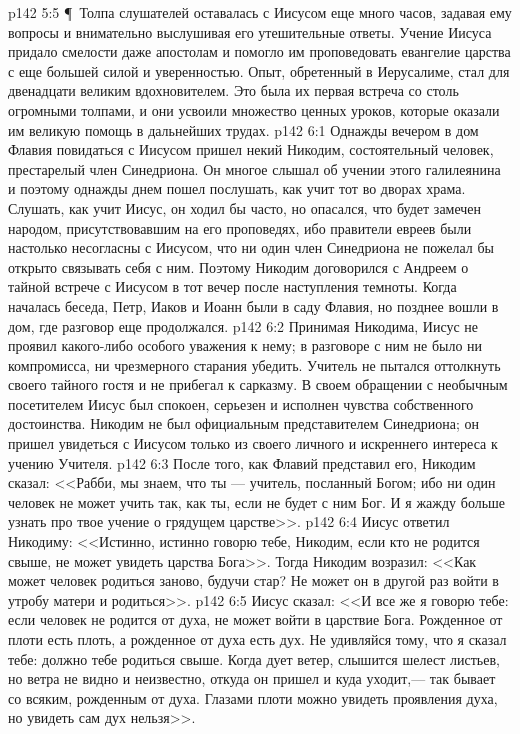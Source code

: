 \vs p142 5:5 \P\ Толпа слушателей оставалась с Иисусом еще много часов, задавая ему вопросы и внимательно выслушивая его утешительные ответы. Учение Иисуса придало смелости даже апостолам и помогло им проповедовать евангелие царства с еще большей силой и уверенностью. Опыт, обретенный в Иерусалиме, стал для двенадцати великим вдохновителем. Это была их первая встреча со столь огромными толпами, и они усвоили множество ценных уроков, которые оказали им великую помощь в дальнейших трудах.
\vs p142 6:1 Однажды вечером в дом Флавия повидаться с Иисусом пришел некий Никодим, состоятельный человек, престарелый член Синедриона. Он многое слышал об учении этого галилеянина и поэтому однажды днем пошел послушать, как учит тот во дворах храма. Слушать, как учит Иисус, он ходил бы часто, но опасался, что будет замечен народом, присутствовавшим на его проповедях, ибо правители евреев были настолько несогласны с Иисусом, что ни один член Синедриона не пожелал бы открыто связывать себя с ним. Поэтому Никодим договорился с Андреем о тайной встрече с Иисусом в тот вечер после наступления темноты. Когда началась беседа, Петр, Иаков и Иоанн были в саду Флавия, но позднее вошли в дом, где разговор еще продолжался.
\vs p142 6:2 Принимая Никодима, Иисус не проявил какого\hyp{}либо особого уважения к нему; в разговоре с ним не было ни компромисса, ни чрезмерного старания убедить. Учитель не пытался оттолкнуть своего тайного гостя и не прибегал к сарказму. В своем обращении с необычным посетителем Иисус был спокоен, серьезен и исполнен чувства собственного достоинства. Никодим не был официальным представителем Синедриона; он пришел увидеться с Иисусом только из своего личного и искреннего интереса к учению Учителя.
\vs p142 6:3 После того, как Флавий представил его, Никодим сказал: <<Рабби, мы знаем, что ты --- учитель, посланный Богом; ибо ни один человек не может учить так, как ты, если не будет с ним Бог. И я жажду больше узнать про твое учение о грядущем царстве>>.
\vs p142 6:4 Иисус ответил Никодиму: <<Истинно, истинно говорю тебе, Никодим, если кто не родится свыше, не может увидеть царства Бога>>. Тогда Никодим возразил: <<Как может человек родиться заново, будучи стар? Не может он в другой раз войти в утробу матери и родиться>>.
\vs p142 6:5 Иисус сказал: <<И все же я говорю тебе: если человек не родится от духа, не может войти в царствие Бога. Рожденное от плоти есть плоть, а рожденное от духа есть дух. Не удивляйся тому, что я сказал тебе: должно тебе родиться свыше. Когда дует ветер, слышится шелест листьев, но ветра не видно и неизвестно, откуда он пришел и куда уходит,--- так бывает со всяким, рожденным от духа. Глазами плоти можно увидеть проявления духа, но увидеть сам дух нельзя>>.
